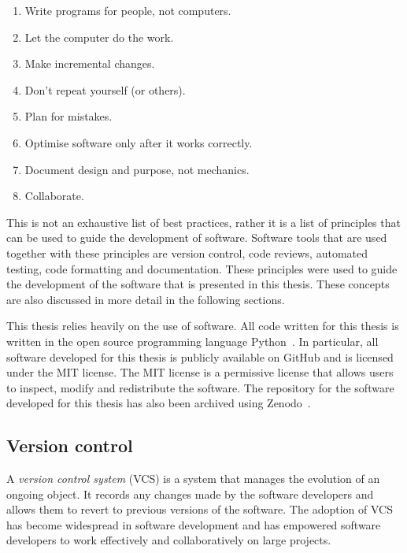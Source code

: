 \begin{enumerate}
    \item Write programs for people, not computers. \label{best_practice_1}
    \item Let the computer do the work. \label{best_practice_2}
    \item Make incremental changes. \label{best_practice_3}
    \item Don't repeat yourself (or others). \label{best_practice_4}
    \item Plan for mistakes. \label{best_practice_5}
    \item Optimise software only after it works correctly.
    \label{best_practice_6}
    \item Document design and purpose, not mechanics. \label{best_practice_7}
    \item Collaborate. \label{best_practice_8}
\end{enumerate}

This is not an exhaustive list of best practices, rather it is a list of
principles that can be used to guide the development of software.
Software tools that are used together with these principles are version control,
code reviews, automated testing, code formatting and documentation.
These principles were used to guide the development of the software that is
presented in this thesis.
These concepts are also discussed in more detail in the following sections.

This thesis relies heavily on the use of software.
All code written for this thesis is written in the open source programming
language Python~\cite{van1995python}.
In particular, all software developed for this thesis is publicly available on
GitHub and is licensed under the MIT license.
The MIT license is a permissive license that allows users to inspect, modify
and redistribute the software.
The repository for the software developed for this thesis has also been
archived using Zenodo~\cite{ambulance_game_github_repo}.


\subsection{Version control}

A \textit{version control system} (VCS) is a system that manages the evolution
of an ongoing object.
It records any changes made by the software developers and allows them to
revert to previous versions of the software.
The adoption of VCS has become widespread in software development and has
empowered software developers to work effectively and collaboratively on large
projects.

